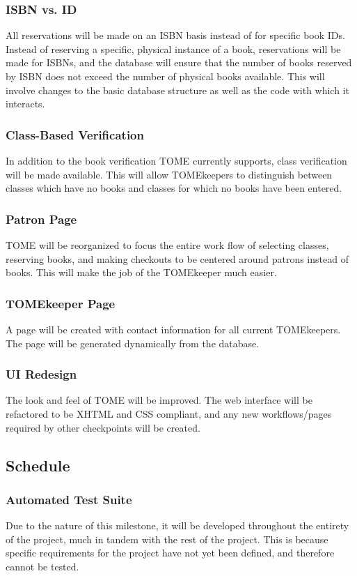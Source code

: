 \documentclass[12pt,titlepage]{article}
\begin{document}
\subsubsection{ISBN vs. ID}
All reservations will be made on an ISBN basis instead of for specific book IDs. Instead of reserving a specific, physical instance of a book, reservations will be made for ISBNs, and the database will ensure that the number of books reserved by ISBN does not exceed the number of physical books available. This will involve changes to the basic database structure as well as the code with which it interacts.
\subsubsection{Class-Based Verification}
In addition to the book verification TOME currently supports, class verification will be made available. This will allow TOMEkeepers to distinguish between classes which have no books and classes for which no books have been entered.
\subsubsection{Patron Page}
TOME will be reorganized to focus the entire work flow of selecting classes, reserving books, and making checkouts to be centered around patrons instead of books. This will make the job of the TOMEkeeper much easier.
\subsubsection{TOMEkeeper Page}
A page will be created with contact information for all current TOMEkeepers. The page will be generated dynamically from the database.
\subsubsection{UI Redesign}
The look and feel of TOME will be improved. The web interface will be refactored to be XHTML and CSS compliant, and any new workflows/pages required by other checkpoints will be created.
\subsection{Schedule}
\subsubsection{Automated Test Suite}
Due to the nature of this milestone, it will be developed throughout the entirety of the project, much in tandem with the rest of the project.  This is because specific requirements for the project have not yet been defined, and therefore cannot be tested.
\end{document}
